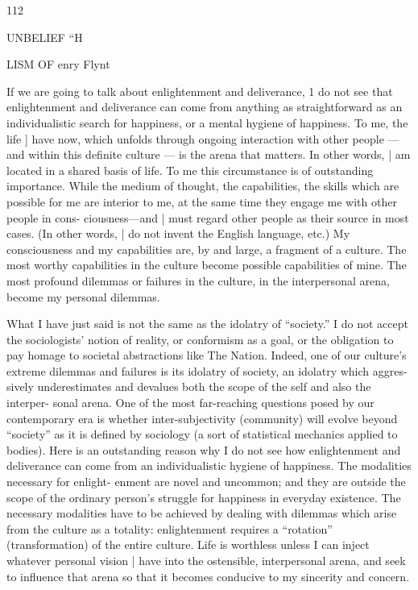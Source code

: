 112 


UNBELIEF “H 


LISM OF 
enry Flynt 


If we are going to talk about enlightenment and deliverance, 1 do not see that 
enlightenment and deliverance can come from anything as straightforward as an 
individualistic search for happiness, or a mental hygiene of happiness. To me, the 
life ] have now, which unfolds through ongoing interaction with other people —and 
within this definite culture — is the arena that matters. In other words, | am located 
in a shared basis of life. To me this circumstance is of outstanding importance. 
While the medium of thought, the capabilities, the skills which are possible for me 
are interior to me, at the same time they engage me with other people in cons- 
ciousness—and | must regard other people as their source in most cases. (In other 
words, | do not invent the English language, etc.) My consciousness and my 
capabilities are, by and large, a fragment of a culture. The most worthy capabilities 
in the culture become possible capabilities of mine. The most profound dilemmas 
or failures in the culture, in the interpersonal arena, become my personal dilemmas. 


What I have just said is not the same as the idolatry of “society.” I do not accept 
the sociologists’ notion of reality, or conformism as a goal, or the obligation to pay 
homage to societal abstractions like The Nation. Indeed, one of our culture's 
extreme dilemmas and failures is its idolatry of society, an idolatry which aggres- 
sively underestimates and devalues both the scope of the self and also the interper- 
sonal arena. One of the most far-reaching questions posed by our contemporary 
era is whether inter-subjectivity (community) will evolve beyond “society” as it is 
defined by sociology (a sort of statistical mechanics applied to bodies). Here is an 
outstanding reason why I do not see how enlightenment and deliverance can come 
from an individualistic hygiene of happiness. The modalities necessary for enlight- 
enment are novel and uncommon; and they are outside the scope of the ordinary 
person's struggle for happiness in everyday existence. The necessary modalities 
have to be achieved by dealing with dilemmas which arise from the culture as a 
totality: enlightenment requires a “rotation” (transformation) of the entire culture. 
Life is worthless unless I can inject whatever personal vision | have into the 
ostensible, interpersonal arena, and seek to influence that arena so that it becomes 
conducive to my sincerity and concern. 


